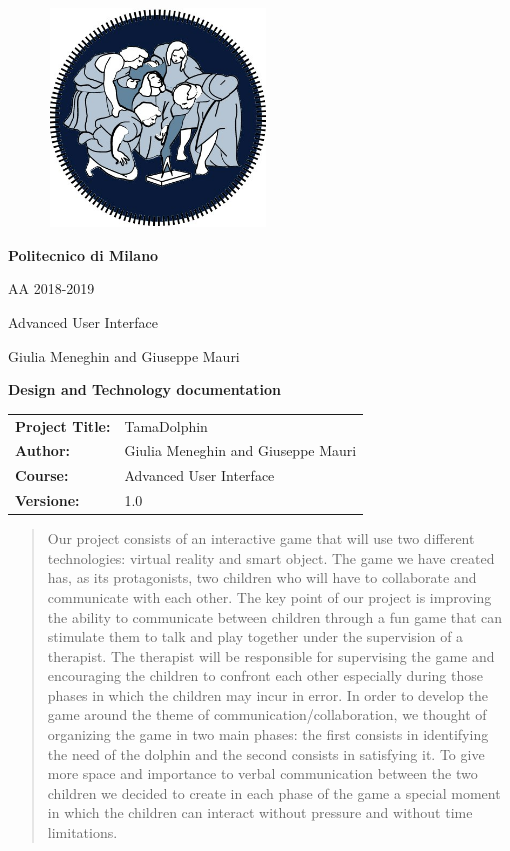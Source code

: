 \documentclass [12pt]{article}
\begin{document}
\begin{figure}[ht!]
\centering
\includegraphics[height=5.8cm,width=5.8cm]{logopoli.jpg}
\end{figure}
\begin{large}
\centerline{\textbf{Politecnico di Milano} }
\centerline{AA 2018-2019}
\vspace{0.5cm}
\centerline{Advanced User Interface}
\centerline{Giulia Meneghin and Giuseppe Mauri}
\centerline{\textbf{Design and Technology documentation}}
\end{large}
 



\begin{table}[h!]
\begin{tabu} to \textwidth { X[0.3,r,p] X[0.7,l,p] }
\hline

\textbf{Project Title:} &TamaDolphin \\
\textbf{Author:} & Giulia Meneghin and Giuseppe Mauri\\
\textbf{Course:} & Advanced User Interface \\
\textbf{Versione:} & 1.0 \\ 
\hline
\end{tabu}
\end{table}

\begin{abstract}
Our project consists of an interactive game that will use two different technologies: virtual reality and smart object. The game we have created has, as its protagonists, two children who will have to collaborate and communicate with each other. The key point of our project is improving the ability to communicate between children through a fun game that can stimulate them to talk and play together under the supervision of a therapist. The therapist will be responsible for supervising the game and encouraging the children to confront each other especially during those phases in which the children may incur in error. In order to develop the game around the theme of communication/collaboration, we thought of organizing the game in two main phases: the first consists in identifying the need of the dolphin and the second consists in satisfying it. To give more space and importance to verbal communication between the two children we decided to create in each phase of the game a special moment in which the children can interact without pressure and without time limitations.
\end{abstract}
\end{document}
